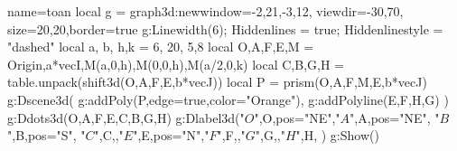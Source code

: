 \documentclass[12pt]{standalone}
\begin{document}
\begin{luadraw}{name=toan}
local g = graph3d:new{window={-2,21,-3,12}, viewdir={-30,70}, size={20,20},border=true}
g:Linewidth(6); Hiddenlines = true; Hiddenlinestyle = "dashed"
local a, b, h,k = 6, 20, 5,8
local O,A,F,E,M = Origin,a*vecI,M(a,0,h),M(0,0,h),M(a/2,0,k)
local C,B,G,H = table.unpack(shift3d({O,A,F,E},b*vecJ))
local P = prism({O,A,F,M,E},b*vecJ)
g:Dscene3d(
    g:addPoly(P,{edge=true,color="Orange"}), 
    g:addPolyline({{E,F},{H,G}})
)
g:Ddots3d({O,A,F,E,C,B,G,H})
g:Dlabel3d("$O$",O,{pos="NE"},"$A$",A,{pos="NE"}, "$B$",B,{pos="S"}, "$C$",C,{},"$E$",E,{pos="N"},"$F$",F,{},"$G$",G,{},"$H$",H,{} )
g:Show()
\end{luadraw}
\end{document}
